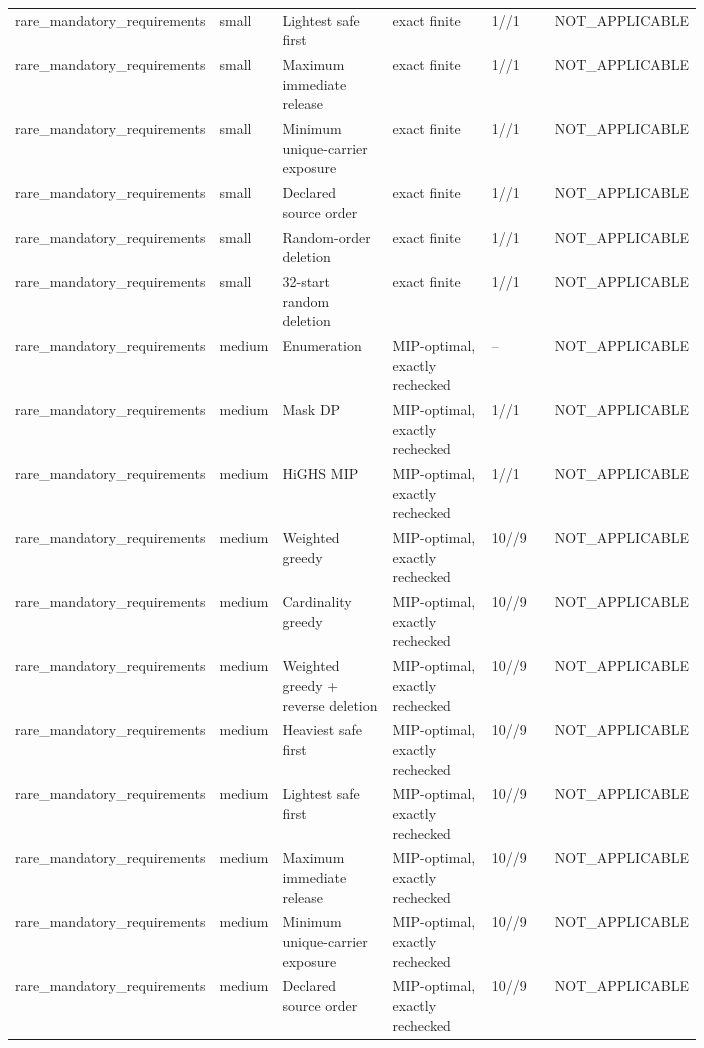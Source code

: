 {\begin{longtable}{p{0.18\linewidth}p{0.07\linewidth}p{0.17\linewidth}p{0.16\linewidth}p{0.10\linewidth}p{0.12\linewidth}}
rare\_mandatory\_requirements & small & Lightest safe first & exact finite & 1//1 & NOT\_APPLICABLE \\
rare\_mandatory\_requirements & small & Maximum immediate release & exact finite & 1//1 & NOT\_APPLICABLE \\
rare\_mandatory\_requirements & small & Minimum unique-carrier exposure & exact finite & 1//1 & NOT\_APPLICABLE \\
rare\_mandatory\_requirements & small & Declared source order & exact finite & 1//1 & NOT\_APPLICABLE \\
rare\_mandatory\_requirements & small & Random-order deletion & exact finite & 1//1 & NOT\_APPLICABLE \\
rare\_mandatory\_requirements & small & 32-start random deletion & exact finite & 1//1 & NOT\_APPLICABLE \\
rare\_mandatory\_requirements & medium & Enumeration & MIP-optimal, exactly rechecked & -- & NOT\_APPLICABLE \\
rare\_mandatory\_requirements & medium & Mask DP & MIP-optimal, exactly rechecked & 1//1 & NOT\_APPLICABLE \\
rare\_mandatory\_requirements & medium & HiGHS MIP & MIP-optimal, exactly rechecked & 1//1 & NOT\_APPLICABLE \\
rare\_mandatory\_requirements & medium & Weighted greedy & MIP-optimal, exactly rechecked & 10//9 & NOT\_APPLICABLE \\
rare\_mandatory\_requirements & medium & Cardinality greedy & MIP-optimal, exactly rechecked & 10//9 & NOT\_APPLICABLE \\
rare\_mandatory\_requirements & medium & Weighted greedy + reverse deletion & MIP-optimal, exactly rechecked & 10//9 & NOT\_APPLICABLE \\
rare\_mandatory\_requirements & medium & Heaviest safe first & MIP-optimal, exactly rechecked & 10//9 & NOT\_APPLICABLE \\
rare\_mandatory\_requirements & medium & Lightest safe first & MIP-optimal, exactly rechecked & 10//9 & NOT\_APPLICABLE \\
rare\_mandatory\_requirements & medium & Maximum immediate release & MIP-optimal, exactly rechecked & 10//9 & NOT\_APPLICABLE \\
rare\_mandatory\_requirements & medium & Minimum unique-carrier exposure & MIP-optimal, exactly rechecked & 10//9 & NOT\_APPLICABLE \\
rare\_mandatory\_requirements & medium & Declared source order & MIP-optimal, exactly rechecked & 10//9 & NOT\_APPLICABLE \\

\end{longtable}}

